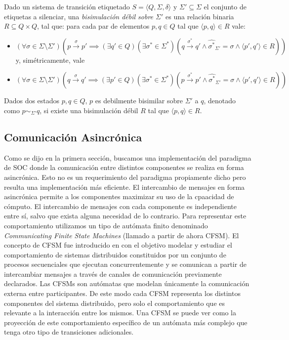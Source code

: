 \begin{definition} Dado un sistema de transición etiquetado $ S = \langle Q, \Sigma, \delta \rangle $ y $\Sigma' \subseteq \Sigma$ el conjunto de etiquetas a silenciar, una \emph{bisimulación débil sobre $\Sigma'$} es una relación binaria $R \subseteq Q \times Q$, tal que: para cada par de elementos $p, q \in Q$ tal que $\langle p, q \rangle \in R$ vale:
\begin{itemize}
    \item $(\forall \sigma \in \Sigma \setminus \Sigma')(p \xrightarrow{\sigma} p' \implies (\exists q' \in Q)(\exists \sigma^* \in \Sigma^*)(q \xrightarrow{\sigma^*} q' \land \widehat{\sigma^*}_{\Sigma'} = \sigma \land \langle p', q' \rangle \in R))$ y, simétricamente, vale 
    \item $(\forall \sigma \in \Sigma \setminus \Sigma')(q \xrightarrow{\sigma} q' \implies (\exists p' \in Q)(\exists \sigma^* \in \Sigma^*)(p \xrightarrow{\sigma^*} p' \land \widehat{\sigma^*}_{\Sigma'} = \sigma \land \langle p', q' \rangle \in R))$
\end{itemize}
Dados dos estados $p, q \in Q $, $p$ es debilmente bisimilar sobre $\Sigma'$ a $q$, denotado como $p \sim_{\Sigma'} q$, si existe una bisimulación débil $R$ tal que $\langle p, q \rangle \in R$.
\end{definition}


\subsection{Comunicación Asincrónica}
Como se dijo en la primera sección, buscamos una implementación del paradigma de SOC donde la comunicación entre distintos componentes se realiza en forma asincrónica. Esto no es un requerimiento del paradigma propiamente dicho pero resulta una implementación más eficiente. El intercambio de mensajes en forma asincrónica permite a los componentes maximizar su uso de la cpaacidad de cómputo.  El intercambio de mensajes con cada componente es independiente entre sí, salvo que exista alguna necesidad de lo contrario. Para representar este comportamiento utilizamos un tipo de autómata finito denominado \emph{Communicating Finite State Machines} (llamado a partir de ahora CFSM). El concepto de CFSM fue introducido en \cite{brand:jacm-30_2} con el objetivo modelar y estudiar el comportamiento de sistemas distribuidos constituidos por un conjunto de procesos secuenciales que ejecutan concurrentemente y se comunican a partir de intercambiar mensajes a través de canales de comunicación previamente declarados. Las CFSMs son autómatas que modelan únicamente la comunicación externa entre participantes. De este modo cada CFSM representa los distintos componentes del sistema distribuido, pero solo el comportamiento que es relevante a la interacción entre los mismos. Una CFSM se puede ver como la proyección de este comportamiento específico de un autómata más complejo que tenga otro tipo de transiciones adicionales.

